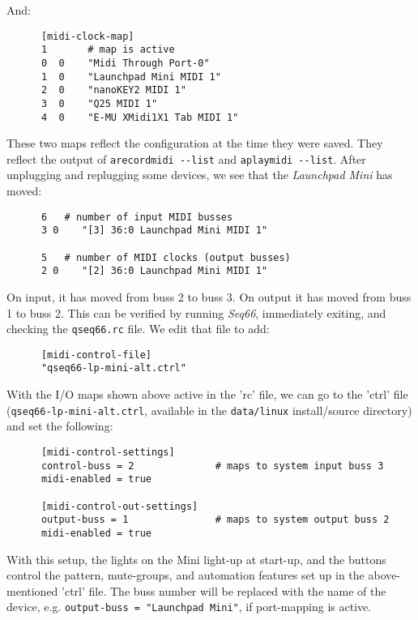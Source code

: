    And:

   \begin{verbatim}
      [midi-clock-map]
      1       # map is active
      0  0    "Midi Through Port-0"
      1  0    "Launchpad Mini MIDI 1"
      2  0    "nanoKEY2 MIDI 1"
      3  0    "Q25 MIDI 1"
      4  0    "E-MU XMidi1X1 Tab MIDI 1"
   \end{verbatim}

   These two maps reflect the configuration at the time they were saved.
   They reflect the output of \texttt{arecordmidi -{}-list} and
   \texttt{aplaymidi -{}-list}.
   After unplugging and replugging some devices, we see that the
   \textsl{Launchpad Mini} has moved:

   \begin{verbatim}
      6   # number of input MIDI busses
      3 0    "[3] 36:0 Launchpad Mini MIDI 1"

      5   # number of MIDI clocks (output busses)
      2 0    "[2] 36:0 Launchpad Mini MIDI 1"
   \end{verbatim}

   On input, it has moved from buss 2 to buss 3.
   On output it has moved from buss 1 to buss 2.
   This can be verified by running \textsl{Seq66}, immediately exiting,
   and checking the \texttt{qseq66.rc} file.
   We edit that file to add:

   \begin{verbatim}
      [midi-control-file]
      "qseq66-lp-mini-alt.ctrl"
   \end{verbatim}

   With the I/O maps shown above active in the 'rc' file,
   we can go to the 'ctrl' file (\texttt{qseq66-lp-mini-alt.ctrl}, available in
   the \texttt{data/linux} install/source directory)
   and set the following:

   \begin{verbatim}
      [midi-control-settings]
      control-buss = 2              # maps to system input buss 3
      midi-enabled = true

      [midi-control-out-settings]
      output-buss = 1               # maps to system output buss 2
      midi-enabled = true
   \end{verbatim}

   With this setup, the lights on the Mini light-up at start-up, and the
   buttons control the pattern, mute-groups, and automation features set up in
   the above-mentioned 'ctrl' file.
   The buss number will be replaced with the name of the
   device, e.g. \texttt{output-buss = "Launchpad Mini"}, if port-mapping
   is active.

